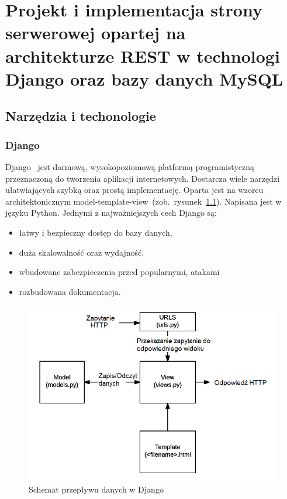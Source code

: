 
\chapter{Projekt i implementacja strony serwerowej opartej na architekturze REST w technologi Django oraz bazy danych MySQL}
\section{Narzędzia i techonologie}
\subsection{Django}
Django~\cite{Django} jest darmową, wysokopoziomową platformą programistyczną przeznaczoną do tworzenia aplikacji internetowych. Dostarcza wiele narzędzi ułatwiających szybką oraz prostą implementację. Oparta jest na wzorcu architektonicznym model-template-view~(zob.~rysunek~\ref{rys:django}). Napisana jest w języku Python. Jednymi z najważniejszych cech Django są:
\begin{itemize}
	\item łatwy i bezpieczny dostęp do bazy danych,
	\item duża skalowalność oraz wydajność,
	\item wbudowane zabezpieczenia przed popularnymi, atakami
	\item rozbudowana dokumentacja.
\end{itemize}
\begin{figure}[H]
	\centering\includegraphics[width=\textwidth]{figures/DjangoSchemat}
	\caption{Schemat przepływu danych w Django~\cite{DjangoSchemat}}\label{rys:django}
\end{figure}
